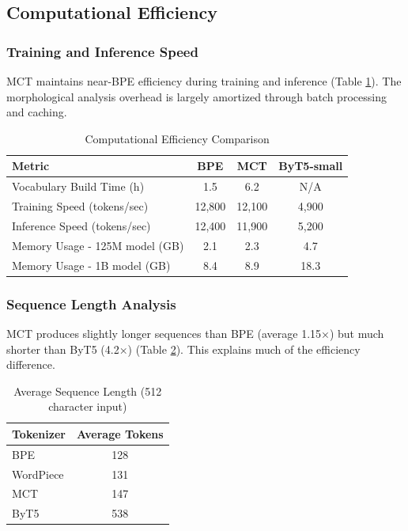\documentclass[conference]{IEEEtran}
\begin{document}
\subsection{Computational Efficiency}

\subsubsection{Training and Inference Speed}
MCT maintains near-BPE efficiency during training and inference (Table \ref{tab:efficiency}). The morphological analysis overhead is largely amortized through batch processing and caching.

\begin{table}[h]
\centering
\caption{Computational Efficiency Comparison}
\label{tab:efficiency}
\begin{tabular}{lccc}
\toprule
\textbf{Metric} & \textbf{BPE} & \textbf{MCT} & \textbf{ByT5-small} \\
\midrule
Vocabulary Build Time (h) & 1.5 & 6.2 & N/A \\
Training Speed (tokens/sec) & 12,800 & 12,100 & 4,900 \\
Inference Speed (tokens/sec) & 12,400 & 11,900 & 5,200 \\
Memory Usage - 125M model (GB) & 2.1 & 2.3 & 4.7 \\
Memory Usage - 1B model (GB) & 8.4 & 8.9 & 18.3 \\
\bottomrule
\end{tabular}
\end{table}

\subsubsection{Sequence Length Analysis}
MCT produces slightly longer sequences than BPE (average 1.15×) but much shorter than ByT5 (4.2×) (Table \ref{tab:seq_length}). This explains much of the efficiency difference.

\begin{table}[h]
\centering
\caption{Average Sequence Length (512 character input)}
\label{tab:seq_length}
\begin{tabular}{lc}
\toprule
\textbf{Tokenizer} & \textbf{Average Tokens} \\
\midrule
BPE & 128 \\
WordPiece & 131 \\
MCT & 147 \\
ByT5 & 538 \\
\bottomrule
\end{tabular}
\end{table}
\end{document}
